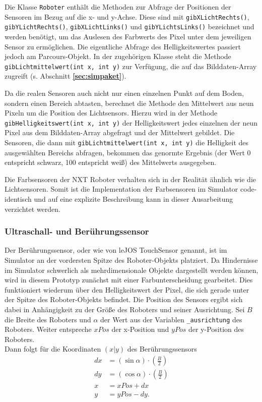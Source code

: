 \documentclass[paper=a4, DIV=calc, BCOR=12mm, twoside=on, onecolumn=on, open = right, titlepage =on, parskip =half-, headsepline = on, footsepline = off, chapterprefix = off, appendixprefix = on, fontsize = 12pt, numbers = noenddot, abstract = on]{scrbook}
\begin{document}
\vspace*{2ex}
Die Klasse \texttt{Roboter} enthält die Methoden zur Abfrage der Positionen der Sensoren im Bezug auf die x- und y-Achse. Diese sind mit \texttt{gib\-X\-Licht\-Rechts()}, \texttt{gib\-Y\-Licht\-Rechts()}, \texttt{gib\-X\-Licht\-Links()} und \texttt{gibYLichtsLinks()} bezeichnet und werden benötigt, um das Auslesen des Farbwerts des Pixel unter dem jeweiligen Sensor zu ermöglichen. Die eigentliche Abfrage des Helligkeitswertes passiert jedoch am Parcours-Objekt. In der zugehörigen Klasse steht die Methode \texttt{gibLichtmittelwert(int x, int y)} zur Verfügung, die auf das Bilddaten-Array zugreift (s. Abschnitt \textbf{\ref{sec:simpaket}}).

Da die realen Sensoren auch nicht nur einen einzelnen Punkt auf dem Boden, sondern einen Bereich abtasten, berechnet die Methode den Mittelwert aus neun Pixeln um die Position des Lichtsensors. Hierzu wird in der Methode \texttt{gib\-Hellig\-keits\-wert(int x, int y)} der Helligkeitswert jedes einzelnen der neun Pixel aus dem Bilddaten-Array abgefragt und der Mittelwert gebildet. Die Sensoren, die dann mit \texttt{gib\-Licht\-mittel\-wert(int x, int y)} die Helligkeit des ausgewählten Bereichs abfragen, bekommen das genormte Ergebnis (der Wert 0 entspricht schwarz, 100 entspricht weiß) des Mittelwerts ausgegeben.

Die Farbsensoren der NXT Roboter verhalten sich in der Realität ähnlich wie die Lichtsensoren. Somit ist die Implementation der Farbsensoren im Simulator code-identisch und auf eine explizite Beschreibung kann in dieser Ausarbeitung verzichtet werden.

\subsubsection{Ultraschall- und Berührungssensor}
Der Berührungssensor, oder wie von leJOS TouchSensor genannt, ist im Simulator an der vordersten Spitze des Roboter-Objekts platziert. Da Hindernisse im Simulator schwerlich als mehrdimensionale Objekte dargestellt werden können, wird in diesem Prototyp zunächst mit einer Farbunterscheidung gearbeitet. Dies funktioniert wiederum über den Helligkeitswert der Pixel, die sich gerade unter der Spitze des Roboter-Objekts befindet. Die Position des Sensors ergibt sich dabei in Anhängigkeit zu der Größe des Roboters und seiner Ausrichtung. Sei $B$ die Breite des Roboters und $\alpha$ der Wert aus der Variablen \texttt{{\_}ausrichtung} des Roboters. Weiter entspreche $xPos$ der x-Position und $yPos$ der y-Position des Roboters.\\
Dann folgt für die Koordinaten $\left( x \vert y \right)$ des Berührungssensors
\begin{align*}
dx & = \left( \sin \alpha \right) \cdot \left( \frac{B}{2} \right)\\
dy & = \left( \cos \alpha \right) \cdot \left( \frac{B}{2} \right)\\
 x & = xPos + dx\\
 y & = yPos - dy.
\end{align*}
\end{document}
